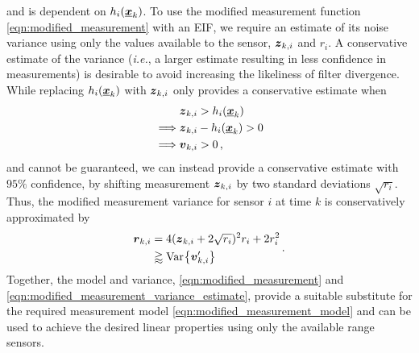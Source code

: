 \documentclass[10pt,letterpaper,oneside,twocolumn,journal]{IEEEtran}
\theoremstyle{definition}
\theoremstyle{definition}
\theoremstyle{remark}
\begin{document}
and is dependent on $h_i({\boldsymbol{\underline{x}}}_k)$. To use the modified measurement function \eqref{eqn:modified_measurement} with an EIF, we require an estimate of its noise variance using only the values available to the sensor, ${\boldsymbol{z}}_{k,i}$ and $r_i$. A conservative estimate of the variance (\textit{i.e.}, a larger estimate resulting in less confidence in measurements) is desirable to avoid increasing the likeliness of filter divergence. While replacing $h_i({\boldsymbol{\underline{x}}}_k)$ with ${\boldsymbol{z}}_{k,i}$ only provides a conservative estimate when
\begin{equation}
    \begin{split}
        &{\boldsymbol{z}}_{k,i} > h_i({\boldsymbol{\underline{x}}}_k) \\
        \implies &{\boldsymbol{z}}_{k,i} - h_i({\boldsymbol{\underline{x}}}_k) > 0 \\
        \implies &{\boldsymbol{v}}_{k,i} > 0\,,
    \end{split}
\end{equation}
and cannot be guaranteed, we can instead provide a conservative estimate with $95\%$ confidence, by shifting measurement ${\boldsymbol{z}}_{k,i}$ by two standard deviations $\sqrt{r_i}$. Thus, the modified measurement variance for sensor $i$ at time $k$ is conservatively approximated by
\begin{equation}
    \begin{split}
        \rv{r}_{k, i} &= 4(\rv{z}_{k,i} + 2\sqrt{r_i})^2r_i + 2r_i^2 \\
        &\gtrapprox \Var{\rv{v}'_{k,i}}
    \end{split}\,. \label{eqn:modified_measurement_variance_estimate}
\end{equation}
Together, the model and variance, \eqref{eqn:modified_measurement} and \eqref{eqn:modified_measurement_variance_estimate}, provide a suitable substitute for the required measurement model \eqref{eqn:modified_measurement_model} and can be used to achieve the desired linear properties using only the available range sensors.

% 
% 
\end{document}
